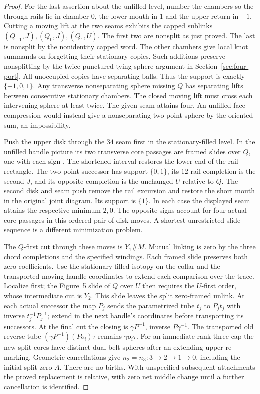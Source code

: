 \documentclass[11pt,letterpaper]{article}
\numberwithin{equation}{section}
\theoremstyle{remark}
\begin{document}
\begin{proof}
For the last assertion about the unfilled level, number the chambers
so the through rails lie in chamber \(0\), the lower mouth in \(1\)
and the upper return in \(-1\). Cutting a moving lift at the two
seams exhibits the capped sublinks
\((Q_{-1},J),(Q_0,J),(Q_1,U)\).
The first two are nonsplit as just proved. The last is nonsplit by
the nonidentity capped word. The other chambers give local knot
summands on forgetting their stationary copies. Such additions
preserve nonsplitting by the twice-punctured tying-sphere argument
in Section~\ref{sec:four-port}. All unoccupied copies have separating
balls. Thus the support is exactly \(\{-1,0,1\}\).
Any transverse nonseparating sphere missing \(Q\) has separating
lifts between consecutive stationary chambers. The closed moving
lift must cross each intervening sphere at least twice. The given
seam attains four. An unfilled face compression would instead give
a nonseparating two-point sphere by the oriented sum, an impossibility.

Push the upper disk through the \(34\) seam first in the
stationary-filled level. In the unfilled handle picture its two
transverse core passages are framed slides over \(Q\), one with
each sign \cite[proof of Proposition 3.2]{GompfScharlemannThompson2010}.
The shortened interval restores the lower end of the rail rectangle.
The two-point successor has support \(\{0,1\}\), its \(12\) rail
completion is the second \(J\), and its opposite completion is the
unchanged \(U\) relative to \(Q\). The second disk and seam push
remove the rail excursion and restore the short mouth in the
original joint diagram. Its support is \(\{1\}\). In each case
the displayed seam attains the respective minimum \(2,0\).
The opposite signs account for four actual core passages in this
ordered pair of disk moves. A shortest unrestricted slide sequence
is a different minimization problem.

The \(Q\)-first cut through these moves is \(Y_1\#M\). Mutual
linking is zero by the three chord completions and the specified
windings. Each framed slide preserves both zero coefficients.
Use the stationary-filled isotopy on the collar and the transported
moving handle coordinates to extend each comparison over the trace.
Localize first; the Figure~5 slide of \(Q\) over \(U\) then requires
the \(U\)-first order, whose intermediate cut is \(Y_2\). This slide
leaves the split zero-framed unlink. At each actual successor the
map \(P_j\) sends the parametrized tube \(t_j\) to \(P_j t_j\)
with inverse \(t_j^{-1}P_j^{-1}\); extend in the next handle's
coordinates before transporting its successors. At the final cut
the closing is \(\gamma P^{-1}\), inverse \(P\gamma^{-1}\).
The transported old reverse tube \((\gamma P^{-1})(Po_i)\tau\)
remains \(\gamma o_i\tau\). For an immediate rank-three cap the
new split cores have distinct dual belt spheres after an extending
upper re-marking. Geometric cancellations give
\(n_2=n_3:3\to2\to1\to0\), including the initial split zero
\(A\). There are no births. With unspecified subsequent
attachments the proved replacement is relative, with zero net
middle change until a further cancellation is identified.
\end{proof}
\end{document}

